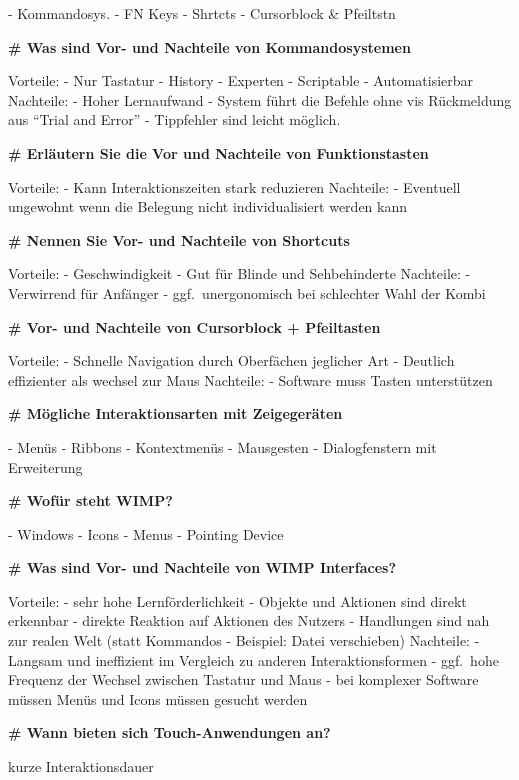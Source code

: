 \documentclass{article}
\begin{document}
\begin{multicols}{3}
\begin{flushleft}
\begin{tiny}
			- Kommandosys.
			- FN Keys
			- Shrtcts
			- Cursorblock \& Pfeiltstn

			\textbf{\# Was sind Vor- und Nachteile von Kommandosystemen}

			Vorteile:
			- Nur Tastatur
			- History
			- Experten
			- Scriptable
			- Automatisierbar
			Nachteile:
			- Hoher Lernaufwand
			- System führt die Befehle ohne vis Rückmeldung aus ``Trial and
			  Error''
			- Tippfehler sind leicht möglich.

			\textbf{\# Erläutern Sie die Vor und Nachteile von Funktionstasten}

			Vorteile:
			- Kann Interaktionszeiten stark reduzieren
			Nachteile:
			- Eventuell ungewohnt wenn die Belegung nicht individualisiert
			  werden kann

			\textbf{\# Nennen Sie Vor- und Nachteile von Shortcuts}

			Vorteile:
			- Geschwindigkeit
			- Gut für Blinde und Sehbehinderte
			Nachteile:
			- Verwirrend für Anfänger
			- ggf.\ unergonomisch bei schlechter Wahl der Kombi

			\textbf{\# Vor- und Nachteile von Cursorblock + Pfeiltasten}

			Vorteile:
			- Schnelle Navigation durch Oberfächen jeglicher Art
			- Deutlich effizienter als wechsel zur Maus
			Nachteile:
			- Software muss Tasten unterstützen

			\textbf{\# Mögliche Interaktionsarten mit Zeigegeräten}

			- Menüs
			- Ribbons
			- Kontextmenüs
			- Mausgesten
			- Dialogfenstern mit Erweiterung

			\textbf{\# Wofür steht WIMP?}

			- Windows
			- Icons
			- Menus
			- Pointing Device

			\textbf{\# Was sind Vor- und Nachteile von WIMP Interfaces?}

			Vorteile:
			- sehr hohe Lernförderlichkeit
			- Objekte und Aktionen sind direkt erkennbar
			- direkte Reaktion auf Aktionen des Nutzers
			- Handlungen sind nah zur realen Welt
			  (statt Kommandos - Beispiel: Datei verschieben)
			Nachteile:
			- Langsam und ineffizient im Vergleich zu anderen
			  Interaktionsformen
			- ggf.\ hohe Frequenz der Wechsel zwischen Tastatur und Maus
			- bei komplexer Software müssen Menüs und Icons müssen gesucht
			  werden

			\textbf{\# Wann bieten sich Touch-Anwendungen an?}

			kurze Interaktionsdauer


\end{tiny}
\end{flushleft}
\end{multicols}
\end{document}
